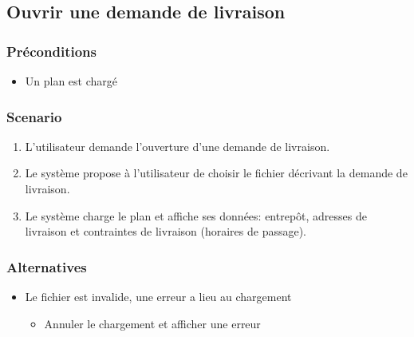 \subsection{Ouvrir une demande de livraison}\hypertarget{ouvrir-une-demande-de-livraison}{}\label{ouvrir-une-demande-de-livraison}

\subsubsection{Préconditions}\hypertarget{prconditions}{}\label{prconditions}

\begin{itemize}
\item Un plan est chargé
\end{itemize}

\subsubsection{Scenario}\hypertarget{scenario}{}\label{scenario}

\begin{enumerate}
\item L'utilisateur demande l'ouverture d'une demande de livraison.
\item Le système propose à l'utilisateur de choisir le fichier décrivant la demande de livraison.
\item Le système charge le plan et affiche ses données: entrepôt, adresses de livraison
et contraintes de livraison (horaires de passage).
\end{enumerate}

\subsubsection{Alternatives}\hypertarget{alternatives}{}\label{alternatives}

\begin{itemize}
\item Le fichier est invalide, une erreur a lieu au chargement


\begin{itemize}
\item Annuler le chargement et afficher une erreur
\end{itemize}
\end{itemize}
